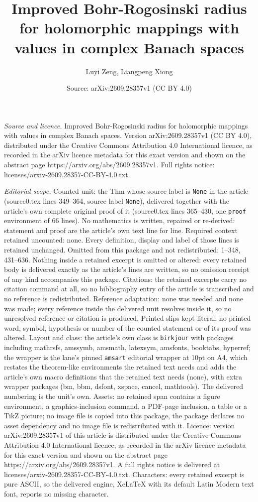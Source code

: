 \documentclass[10pt,a4paper]{amsart}
\title[Improved Bohr-Rogosinski radius for holomorphic mappings wit]{Improved Bohr-Rogosinski radius for holomorphic mappings with values in complex Banach spaces}
\author{Luyi Zeng, Liangpeng Xiong}
\date{Source: arXiv:2609.28357v1 (CC BY 4.0)}
\begin{document}
\maketitle

\noindent\emph{Source and licence.} Improved Bohr-Rogosinski radius for holomorphic mappings with values in complex Banach spaces. Version arXiv:2609.28357v1 (CC BY 4.0), distributed under the Creative Commons Attribution 4.0 International licence, as recorded in the arXiv licence metadata for this exact version and shown on the abstract page https://arxiv.org/abs/2609.28357v1. Full rights notice: licenses/arxiv-2609.28357-CC-BY-4.0.txt.\par\smallskip

\noindent\textit{Editorial scope.} Counted unit: the Thm whose source label is \texttt{None} in the article (source0.tex lines 349--364, source label \texttt{None}), delivered together with the article's own complete original proof of it (source0.tex lines 365--430, one \texttt{proof} environment of 66 lines). No mathematics is written, repaired or re-derived: statement and proof are the article's own text line for line. Required context retained uncounted: none. Every definition, display and label of those lines is retained unchanged. Omitted from this package and not redistributed: 1--348, 431--636. Nothing inside a retained excerpt is omitted or altered: every retained body is delivered exactly as the article's lines are written, so no omission receipt of any kind accompanies this package. Citations: the retained excerpts carry no citation command at all, so no bibliography entry of the article is transcribed and no reference is redistributed. Reference adaptation: none was needed and none was made; every reference inside the delivered unit resolves inside it, so no unresolved reference or citation is produced. Printed slips kept literal: no printed word, symbol, hypothesis or number of the counted statement or of its proof was altered. Layout and class: the article's own class is \texttt{birkjour} with packages including mathrsfs, amssymb, amsmath, latexsym, amsfonts, booktabs, hyperref; the wrapper is the lane's pinned \texttt{amsart} editorial wrapper at 10pt on A4, which restates the theorem-like environments the retained text needs and adds the article's own macro definitions that the retained text needs (none), with extra wrapper packages (bm, bbm, dsfont, xspace, cancel, mathtools). The delivered numbering is the unit's own. Assets: no retained span contains a figure environment, a graphics-inclusion command, a PDF-page inclusion, a table or a TikZ picture; no image file is copied into this package, the package declares no asset dependency and no image file is redistributed with it. Licence: version arXiv:2609.28357v1 of this article is distributed under the Creative Commons Attribution 4.0 International licence, as recorded in the arXiv licence metadata for this exact version and shown on the abstract page https://arxiv.org/abs/2609.28357v1. A full rights notice is delivered at licenses/arxiv-2609.28357-CC-BY-4.0.txt. Characters: every retained excerpt is pure ASCII, so the delivered engine, XeLaTeX with its default Latin Modern text font, reports no missing character.
\end{document}
